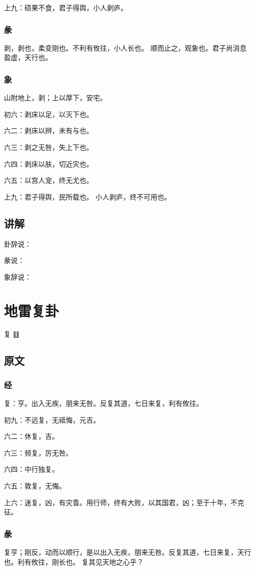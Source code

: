 \documentclass[12pt,oneside]{book}
\begin{document}
上九：硕果不食，君子得舆，小人剥庐。

\subsection{彖}
剥，剥也，柔变刚也。不利有攸往，小人长也。 顺而止之，观象也。君子尚消息盈虚，天行也。
\subsection{象}
山附地上，剥；上以厚下，安宅。

初六：剥床以足，以灭下也。

六二：剥床以辨，未有与也。

六三：剥之无咎，失上下也。

六四：剥床以肤，切近灾也。

六五：以宫人宠，终无尤也。

上九：君子得舆，民所载也。 小人剥庐，终不可用也。

\section{讲解}
卦辞说：

彖说：

象辞说：

\chapter{地雷复卦}
复 {\Large ䷗}

\section{原文}
\subsection{经}
复：亨。出入无疾，朋来无咎。反复其道，七日来复，利有攸往。

初九：不远复，无祗悔，元吉。

六二：休复，吉。

六三：频复，厉无咎。

六四：中行独复。

六五：敦复，无悔。

上六：迷复，凶，有灾眚。用行师，终有大败，以其国君，凶；至于十年，不克征。

\subsection{彖}
复亨；刚反，动而以顺行，是以出入无疾，朋来无咎。反复其道，七日来复，天行也。利有攸往，刚长也。 复其见天地之心乎？
\end{document}
